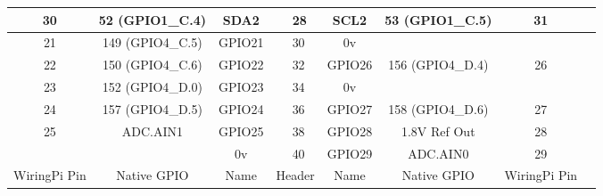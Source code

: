 \documentclass[11pt,a4paper]{article}
\begin{document}
\begin{sffamily}
\begin{center}
\begin{tabular}{|c|c|c||p{8mm}|p{8mm}||c|c|c|c|}
\hline
30	& 52 (GPIO1{\_}C.4)		& \textcolor{rtb-aqua}{SDA2}	& \raggedleft{27} & 28 & \textcolor{rtb-aqua}{SCL2}		& 53 (GPIO1{\_}C.5)			& 31\\
\hline
21	& 149 (GPIO4{\_}C.5)	& \textcolor{rtb-green}{GPIO21}	& \raggedleft{29} & 30 & \textcolor{rtb-black}{0v}		&							& \\
\hline
22	& 150 (GPIO4{\_}C.6)	& \textcolor{rtb-green}{GPIO22}	& \raggedleft{31} & 32 & \textcolor{rtb-green}{GPIO26}	& 156 (GPIO4{\_}D.4)		& 26\\
\hline
23	& 152 (GPIO4{\_}D.0)	& \textcolor{rtb-green}{GPIO23}	& \raggedleft{33} & 34 & \textcolor{rtb-black}{0v}		&							& \\
\hline
24	& 157 (GPIO4{\_}D.5)	& \textcolor{rtb-green}{GPIO24}	& \raggedleft{35} & 36 & \textcolor{rtb-green}{GPIO27}	& 158 (GPIO4{\_}D.6)		& 27\\
\hline
25	& ADC.AIN1				& \textcolor{rtb-green}{GPIO25}	& \raggedleft{37} & 38 & \textcolor{rtb-green}{GPIO28}	& 1.8V Ref Out				& 28\\
\hline
	& 						& \textcolor{rtb-black}{0v}		& \raggedleft{39} & 40 & \textcolor{rtb-green}{GPIO29}	& ADC.AIN0					& 29\\
\hline
\hline
WiringPi Pin	& Native GPIO	& Name	& \multicolumn{2}{|c||}{Header}	& Name	& Native GPIO	& WiringPi Pin\\
\hline
\end{tabular}
\end{center}

\end{sffamily}
\end{document}
